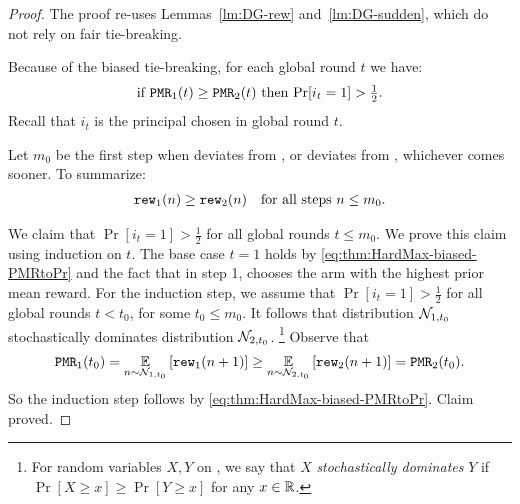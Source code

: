 \begin{proof}
The proof re-uses Lemmas~\ref{lm:DG-rew} and~\ref{lm:DG-sudden}, which do not rely on fair tie-breaking.

Because of the biased tie-breaking, for each global round $t$ we have:
\begin{align}\label{eq:thm:HardMax-biased-PMRtoPr}
\text{if $\mathtt{PMR}_1(t)\geq \mathtt{PMR}_2(t)$ then $\Pr[i_t=1]>\tfrac12$.}
\end{align}
Recall that $i_t$ is the principal chosen in global round $t$.

Let $m_0$ be the first step when \alg[2] deviates from \DynGreedy, or \DynGreedy deviates from \StaticGreedy, whichever comes sooner.  To summarize:
\begin{align}\label{eq:thm:HardMax-biased-rew}
    \mathtt{rew}_1(n)\geq\mathtt{rew}_2(n)\quad \text{for all steps $n\leq m_0$}.
\end{align}

We claim that $\Pr[i_t=1]>\tfrac12$ for all global rounds $t\leq m_0$. We prove this claim using induction on $t$. The base case $t=1$ holds by \eqref{eq:thm:HardMax-biased-PMRtoPr} and the fact that in step 1, \DynGreedy chooses the arm with the highest prior mean reward. For the induction step, we assume that $\Pr[i_t=1]>\tfrac12$ for all global rounds $t<t_0$, for some $t_0\leq  m_0$. It follows that distribution $\mathcal{N}_{1,t_0}$ stochastically dominates distribution $\mathcal{N}_{2,t_0}$.%
\footnote{For random variables $X,Y$ on \R, we say that $X$ \emph{stochastically dominates} $Y$ if $\Pr[X\geq x] \geq \Pr[Y\geq x]$ for any $x\in \mathbb{R}$.}
Observe that
\begin{align}\label{eq:thm:HardMax-biased-PMR-aux}
\mathtt{PMR}_1(t_0)
  = \operatorname*{\mathbb{E}}_{n\sim \mathcal{N}_{1,t_0}}\left[\mathtt{rew}_1(n+1)\right]
  \geq \operatorname*{\mathbb{E}}_{n\sim \mathcal{N}_{2,t_0}}\left[\mathtt{rew}_2(n+1)\right]
  = \mathtt{PMR}_2(t_0).
\end{align}
So the induction step follows by \eqref{eq:thm:HardMax-biased-PMRtoPr}. Claim proved.


\end{proof}

